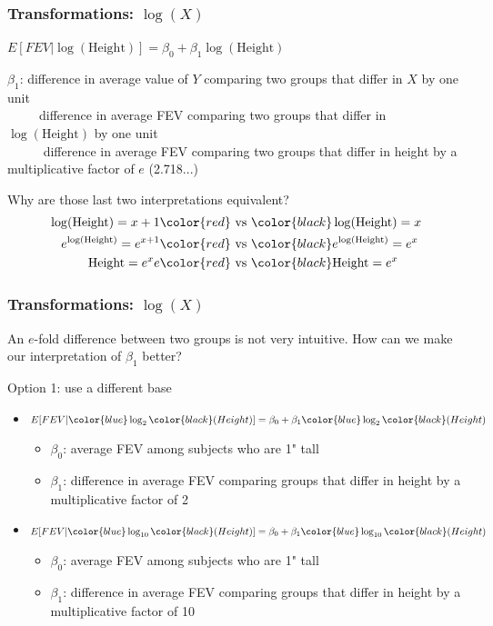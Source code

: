 \documentclass[12pt, 
hyperref={colorlinks=true, linkcolor=blue, urlcolor=cyan}]{beamer}
\begin{document}
\begin{frame}
\frametitle{Transformations: $\log(X)$}
\begin{center} $E[FEV|\log(\text{Height})] = \beta_0 + \beta_1 \log(\text{Height})$ \end{center}

$\beta_1$: difference in average value of $Y$ comparing two groups that differ in $X$ by one unit\\ \pause
\ \ \ \ \ difference in average FEV comparing two groups that differ in $\log(\text{Height})$ by one unit\\ \pause
\ \ \ \ \ \color{blue} difference in average FEV comparing two groups that differ in height by a multiplicative factor of $e$ (2.718...) \color{black} \pause

Why are those last two interpretations equivalent?
\begin{align*}
\log(\text{Height}) = x + 1 &\color{red}\text{ vs }\color{black} \log(\text{Height}) = x \\
e^{\log(\text{Height})} = e^{x+1} &\color{red}\text{ vs }\color{black} e^{\log(\text{Height})} = e^x \\
\text{Height} = e^{x}e &\color{red}\text{ vs }\color{black} \text{Height} = e^{x}
\end{align*}
\end{frame}

\begin{frame}
\frametitle{Transformations: $\log(X)$}
An $e$-fold difference between two groups is not very intuitive. How can we make our interpretation of $\beta_1$ better?

Option 1: use a different base\pause
\begin{itemize}
\item $E[FEV|\color{blue}\log_2\color{black}(Height)] = \beta_0 + \beta_1 \color{blue}\log_2\color{black}(Height)$
	\begin{itemize}
	\item $\beta_0$: average FEV among subjects who are 1" tall
	\item $\beta_1$: difference in average FEV comparing groups that differ in height by a \color{blue} multiplicative factor of 2\color{black}
	\end{itemize} \pause
\item $E[FEV|\color{blue}\log_{10}\color{black}(Height)] = \beta_0 + \beta_1 \color{blue}\log_{10}\color{black}(Height)$
	\begin{itemize}
	\item $\beta_0$: average FEV among subjects who are 1" tall
	\item $\beta_1$: difference in average FEV comparing groups that differ in height by a \color{blue}multiplicative factor of 10\color{black}
	\end{itemize}
\end{itemize}
\end{frame}
\end{document}
